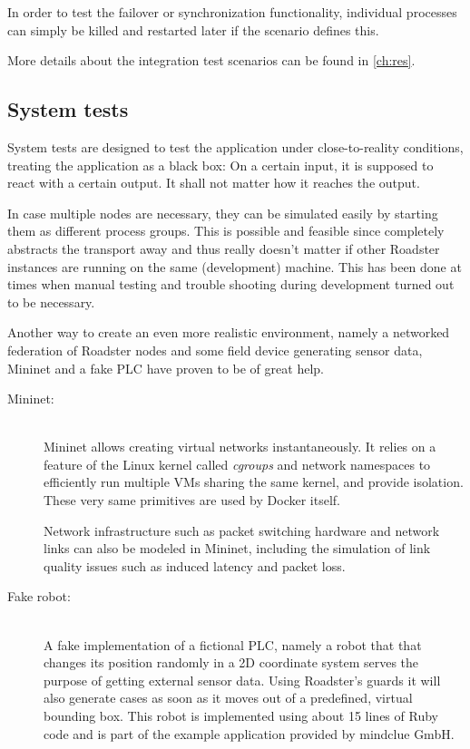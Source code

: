 In order to test the failover or synchronization functionality, individual processes
can simply be killed and restarted later if the scenario defines this.

More details about the integration test scenarios can be found in \autoref{ch:res}.

\subsection{System tests}
System tests are designed to test the application under close-to-reality
conditions, treating the application as a black box: On a certain input, it is
supposed to react with a certain output. It shall not matter how it reaches the output.

In case multiple nodes are necessary, they can be simulated easily by starting
them as different process groups. This is possible and feasible since \zmq
completely abstracts the transport away and thus really doesn't matter if other
Roadster instances are running on the same (development) machine. This has been
done at times when manual testing and trouble shooting during development
turned out to be necessary.

Another way to create an even more realistic environment, namely a networked
federation of Roadster nodes and some field device generating sensor data,
Mininet and a fake \gls{PLC} have proven to be of great help.

\begin{description}
	\item [Mininet:]\hfill\\
		Mininet allows creating virtual networks instantaneously. It
		relies on a feature of the Linux kernel called \emph{cgroups}
		and network namespaces to efficiently run multiple \glspl{VM}
		sharing the same kernel, and provide isolation. These very same
		primitives are used by Docker itself.

		Network infrastructure such as packet switching hardware and
		network links can also be modeled in Mininet, including the
		simulation of link quality issues such as induced latency and
		packet loss.

	\item [Fake robot:]\hfill\\
		A fake implementation of a fictional \gls{PLC}, namely a robot
		that that changes its position randomly in a 2D coordinate
		system serves the purpose of getting external sensor data.
		Using Roadster's guards it will also generate cases as soon as
		it moves out of a predefined, virtual bounding box. This robot
		is implemented using about 15 lines of Ruby code and is part of
		the example application provided by mindclue GmbH.
\end{description}

